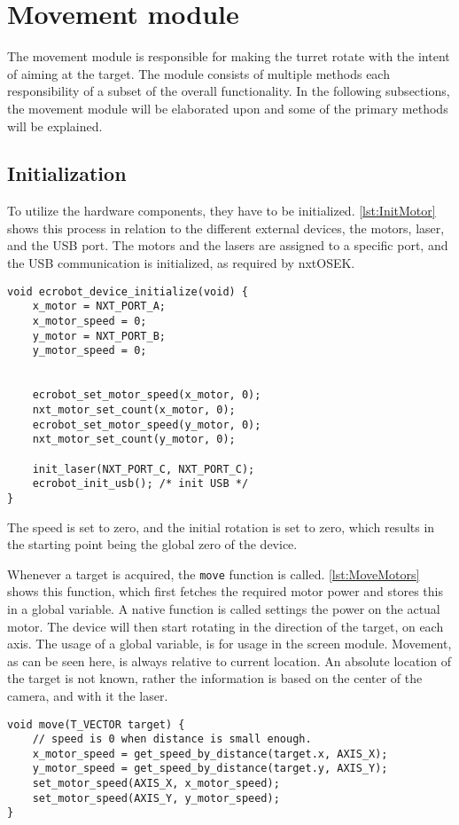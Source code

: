 \section{Movement module}
\label{sec:movement}
The movement module is responsible for making the turret rotate with the intent of aiming at the target.
The module consists of multiple methods each responsibility of a subset of the overall functionality.
In the following subsections, the movement module will be elaborated upon and some of the primary methods will be explained.

\subsection{Initialization}
To utilize the hardware components, they have to be initialized.
\autoref{lst:InitMotor} shows this process in relation to the different external devices, the motors, laser, and the USB port.
The motors and the lasers are assigned to a specific port, and the USB communication is initialized, as required by nxtOSEK.
\begin{lstlisting}[language=CSharp, label={lst:DeviceInit},caption={ecrobot\_device\_initialize method from nxt.c}]
void ecrobot_device_initialize(void) {
	x_motor = NXT_PORT_A;
	x_motor_speed = 0;
	y_motor = NXT_PORT_B;
	y_motor_speed = 0;
	
	
	ecrobot_set_motor_speed(x_motor, 0);
	nxt_motor_set_count(x_motor, 0);
	ecrobot_set_motor_speed(y_motor, 0);
	nxt_motor_set_count(y_motor, 0);
	
	init_laser(NXT_PORT_C, NXT_PORT_C);
	ecrobot_init_usb(); /* init USB */
}
\end{lstlisting}
The speed is set to zero, and the initial rotation is set to zero, which results in the starting point being the global zero of the device.


Whenever a target is acquired, the \texttt{move} function is called.
\autoref{lst:MoveMotors} shows this function, which first fetches the required motor power and stores this in a global variable.
A native function is called settings the power on the actual motor.
The device will then start rotating in the direction of the target, on each axis.
The usage of a global variable, is for usage in the screen module.
Movement, as can be seen here, is always relative to current location.
An absolute location of the target is not known, rather the information is based on the center of the camera, and with it the laser.

\begin{lstlisting}[language=CSharp,caption={move method from movement.c},label={lst:MoveMotors}]
  void move(T_VECTOR target) {
	// speed is 0 when distance is small enough.
	x_motor_speed = get_speed_by_distance(target.x, AXIS_X);
	y_motor_speed = get_speed_by_distance(target.y, AXIS_Y);
	set_motor_speed(AXIS_X, x_motor_speed);
	set_motor_speed(AXIS_Y, y_motor_speed);
}
\end{lstlisting}


